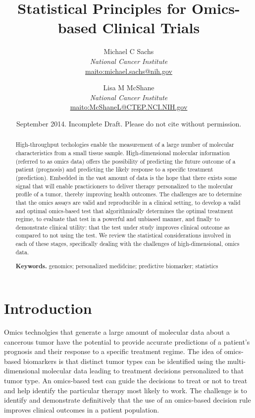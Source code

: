 \documentclass[11pt]{article}
\title{\bigskip \bigskip Statistical Principles for Omics-based Clinical Trials}
\author{\Large Michael C Sachs\vspace{0.05in} \\ \normalsize\emph{National Cancer Institute} \\ \footnotesize \url{maito:michael.sachs@nih.gov}\vspace*{0.2in}\\  \and \Large Lisa M McShane\vspace{0.05in} \\ \normalsize\emph{National Cancer Institute} \\ \footnotesize \url{maito:McShaneL@CTEP.NCI.NIH.gov}\vspace*{0.2in}\\ }
\date{\footnotesize September 2014. Incomplete Draft. Please do not cite without permission.}
\begin{document}
  
		




\maketitle


\begin{abstract}

\noindent High-throughput techologies enable the measurement of a large number of
molecular characteristics from a small tissue sample. High-dimensional
molecular information (referred to as omics data) offers the possibility
of predicting the future outcome of a patient (prognosis) and predicting
the likely response to a specific treatment (prediction). Embedded in
the vast amount of data is the hope that there exists some signal that
will enable practicioners to deliver therapy personalized to the
molecular profile of a tumor, thereby improving health outcomes. The
challenges are to determine that the omics assays are valid and
reproducible in a clinical setting, to develop a valid and optimal
omics-based test that algorithmically determines the optimal treatment
regime, to evaluate that test in a powerful and unbiased manner, and
finally to demonstrate clinical utility: that the test under study
improves clinical outcome as compared to not using the test. We review
the statistical considerations involved in each of these stages,
specifically dealing with the challenges of high-dimensional, omics
data.

\smallskip
\noindent \textbf{Keywords.} genomics; personalized medidcine; predictive biomarker; statistics

\end{abstract}


\section{Introduction}\label{introduction}

Omics technolgies that generate a large amount of molecular data about a
cancerous tumor have the potential to provide accurate predictions of a
patient's prognosis and their response to a specific treatment regime.
The idea of omics-based biomarkers is that distinct tumor types can be
identified using the multi-dimensional molecular data leading to
treatment decisions personalized to that tumor type. An omics-based test
can guide the decisions to treat or not to treat and help identify the
particular therapy most likely to work. The challenge is to identify and
demonstrate definitively that the use of an omics-based decision rule
improves clinical outcomes in a patient population.
\end{document}
